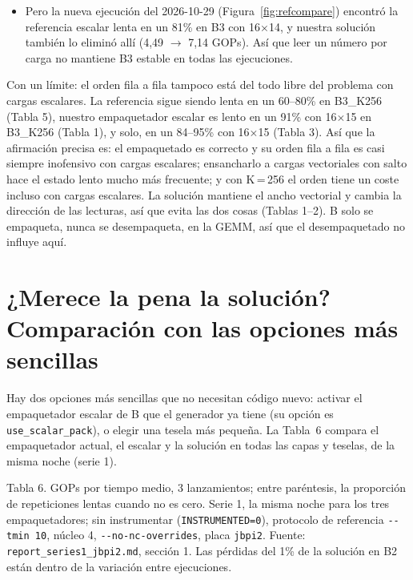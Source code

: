 \begin{enumerate}
\begin{itemize}
    (Tabla 1). Así que, en estas ejecuciones, ensanchar el bucle hace que nuestro diseño caiga en el estado lento mucho más a menudo.
    \item Pero la nueva ejecución del 2026-10-29 (Figura~\ref{fig:refcompare}) encontró la referencia escalar lenta en un 81\% en B3
    con 16$\times$14, y nuestra solución también lo eliminó allí (4,49 $\to$ 7,14 GOPs). Así que leer un número por carga no mantiene
    B3 estable en todas las ejecuciones.
  \end{itemize}
  Con un límite: el orden fila a fila tampoco está del todo libre del problema con cargas escalares. La referencia sigue siendo lenta
  en un 60--80\% en B3\_K256 (Tabla 5), nuestro empaquetador escalar es lento en un 91\% con 16$\times$15 en B3\_K256 (Tabla 1), y
  solo, en un 84--95\% con 16$\times$15 (Tabla 3). Así que la afirmación precisa es: el empaquetado es correcto y su orden fila a fila
  es casi siempre inofensivo con cargas escalares; ensancharlo a cargas vectoriales con salto hace el estado lento mucho más
  frecuente; y con K\,=\,256 el orden tiene un coste incluso con cargas escalares. La solución mantiene el ancho vectorial y cambia la
  dirección de las lecturas, así que evita las dos cosas (Tablas 1--2). B solo se empaqueta, nunca se desempaqueta, en la GEMM, así
  que el desempaquetado no influye aquí.
\end{enumerate}

\section{¿Merece la pena la solución? Comparación con las opciones más sencillas}
\label{sec:worth}
Hay dos opciones más sencillas que no necesitan código nuevo: activar el empaquetador escalar de B que el generador ya tiene (su
opción es \texttt{use\_scalar\_pack}), o elegir una tesela más pequeña. La Tabla~6 compara el empaquetador actual, el escalar y la
solución en todas las capas y teselas, de la misma noche (serie 1).

\begin{center}\footnotesize\setlength{\tabcolsep}{4pt}
\end{center}
{\footnotesize Tabla 6. GOPs por tiempo medio, 3 lanzamientos; entre paréntesis, la proporción de repeticiones lentas cuando no es
cero. Serie 1, la misma noche para los tres empaquetadores; sin instrumentar (\texttt{INSTRUMENTED=0}), protocolo de referencia
\texttt{-{}-tmin 10}, núcleo 4, \texttt{-{}-no-nc-overrides}, placa \texttt{jbpi2}. Fuente: \texttt{report\_series1\_jbpi2.md},
sección 1. Las pérdidas del 1\% de la solución en B2 están dentro de la variación entre ejecuciones.}

